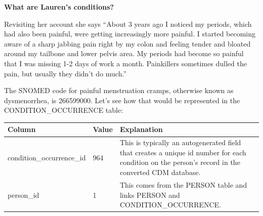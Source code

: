 \documentclass[]{book}
\begin{document}
\textbf{What are Lauren's conditions?}

Revisiting her account she says ``About 3 years ago I noticed my
periods, which had also been painful, were getting increasingly more
painful. I started becoming aware of a sharp jabbing pain right by my
colon and feeling tender and bloated around my tailbone and lower pelvis
area. My periods had become so painful that I was missing 1-2 days of
work a month. Painkillers sometimes dulled the pain, but usually they
didn't do much.''

The SNOMED code for painful menstruation cramps, otherwise known as
dysmenorrhea, is 266599000. Let's see how that would be represented in
the CONDITION\_OCCURRENCE table:

\begin{longtable}[]{@{}lll@{}}
\toprule
\begin{minipage}[b]{0.27\columnwidth}\raggedright\strut
Column\strut
\end{minipage} & \begin{minipage}[b]{0.14\columnwidth}\raggedright\strut
Value\strut
\end{minipage} & \begin{minipage}[b]{0.50\columnwidth}\raggedright\strut
Explanation\strut
\end{minipage}\tabularnewline
\midrule
\endhead
\begin{minipage}[t]{0.27\columnwidth}\raggedright\strut
condition\_occurrence\_id\strut
\end{minipage} & \begin{minipage}[t]{0.14\columnwidth}\raggedright\strut
964\strut
\end{minipage} & \begin{minipage}[t]{0.50\columnwidth}\raggedright\strut
This is typically an autogenerated field that creates a unique id number
for each condition on the person's record in the converted CDM
database.\strut
\end{minipage}\tabularnewline
\begin{minipage}[t]{0.27\columnwidth}\raggedright\strut
person\_id\strut
\end{minipage} & \begin{minipage}[t]{0.14\columnwidth}\raggedright\strut
1\strut
\end{minipage} & \begin{minipage}[t]{0.50\columnwidth}\raggedright\strut
This comes from the PERSON table and links PERSON and
CONDITION\_OCCURRENCE.\strut
\end{minipage}\tabularnewline

\end{longtable}
\end{document}
